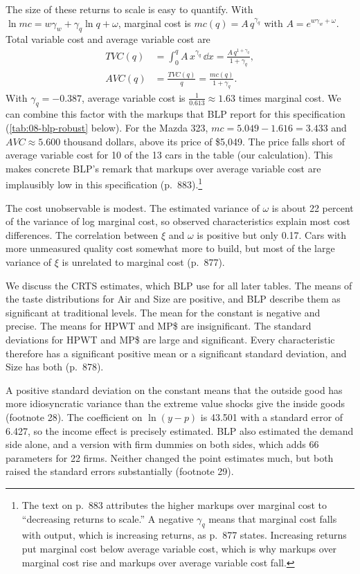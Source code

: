 The size of these returns to scale is easy to quantify. With $\ln mc=w\gamma_w+\gamma_q\ln q+\omega$,
marginal cost is $mc(q)=A\,q^{\gamma_q}$ with $A=e^{w\gamma_w+\omega}$. Total variable cost and average
variable cost are
\begin{align*}
TVC(q)&=\int_0^qA\,x^{\gamma_q}\,\dd x=\frac{A\,q^{1+\gamma_q}}{1+\gamma_q},\\
AVC(q)&=\frac{TVC(q)}{q}=\frac{mc(q)}{1+\gamma_q}.
\end{align*}
With $\gamma_q=-0.387$, average variable cost is $\frac{1}{0.613}\approx1.63$ times marginal cost. We
can combine this factor with the markups that BLP report for this specification (\cref{tab:08-blp-robust}
below). For the Mazda 323, $mc=5.049-1.616=3.433$ and $AVC\approx5.600$ thousand dollars, above its price
of \$5,049. The price falls short of average variable cost for 10 of the 13 cars in the table (our
calculation). This makes concrete BLP's remark that markups over average variable cost are implausibly
low in this specification (p.~883).\footnote{The text on p.~883 attributes the higher markups over
marginal cost to ``decreasing returns to scale.'' A negative $\gamma_q$ means that marginal cost falls
with output, which is increasing returns, as p.~877 states. Increasing returns put marginal cost below
average variable cost, which is why markups over marginal cost rise and markups over average variable
cost fall.}

The cost unobservable is modest. The estimated variance of $\omega$ is about 22 percent of the
variance of log marginal cost, so observed characteristics explain most cost differences. The
correlation between $\xi$ and $\omega$ is positive but only 0.17. Cars with more unmeasured quality
cost somewhat more to build, but most of the large variance of $\xi$ is unrelated to marginal cost
(p.~877).

We discuss the CRTS estimates, which BLP use for all later tables. The means of the taste
distributions for Air and Size are positive, and BLP describe them as significant at traditional levels.
The mean for the constant is negative and precise. The means for HPWT and MP\$ are insignificant. The
standard deviations for HPWT and MP\$ are large and significant. Every characteristic therefore has a
significant positive mean or a significant standard deviation, and Size has both (p.~878).

A positive standard deviation on the constant means that the outside good has more idiosyncratic
variance than the extreme value shocks give the inside goods (footnote 28). The coefficient on
$\ln(y-p)$ is 43.501 with a standard error of 6.427, so the income effect is precisely estimated. BLP
also estimated the demand side alone, and a version with firm dummies on both sides, which adds 66
parameters for 22 firms. Neither changed the point estimates much, but both raised the standard errors
substantially (footnote 29).

